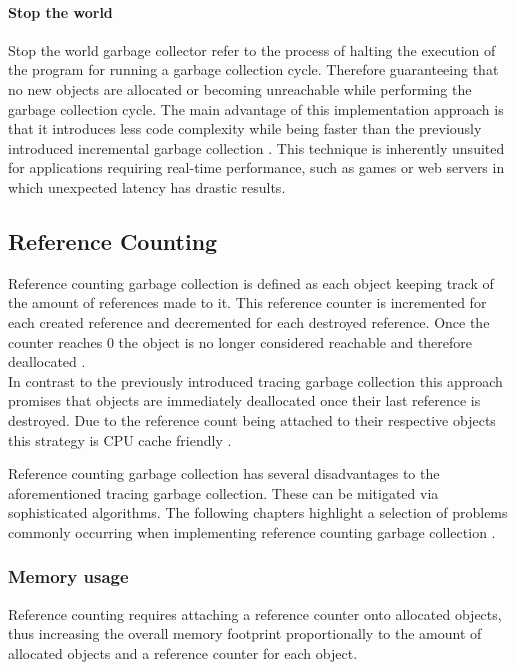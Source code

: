 \paragraph{Stop the world}

Stop the world garbage collector refer to the process of halting the execution
of the program for running a garbage collection cycle. Therefore guaranteeing
that no new objects are allocated or becoming unreachable while performing the
garbage collection cycle. The main advantage of this implementation approach
is that it introduces less code complexity while being faster than the
previously introduced incremental garbage collection \cite[5. The Garbage
Collection Algorithms]{gc-multiprocess_1975}. This technique is inherently
unsuited for applications requiring real-time performance, such as games or
web servers in which unexpected latency has drastic results.

\subsection{Reference Counting}

Reference counting garbage collection is defined as each object keeping track
of the amount of references made to it. This reference counter is incremented
for each created reference and decremented for each destroyed reference. Once
the counter reaches 0 the object is no longer considered reachable and
therefore deallocated \cite[2.2 Precise Reference Counting]{gc-references_2021}
\cite[6. Reference Counting Automatic Storage Reclamation
Algorithms]{gc-generational-scavenging_1984}. \\

In contrast to the previously introduced tracing garbage collection this
approach promises that objects are immediately deallocated once their last
reference is destroyed. Due to the reference count being attached to their
respective objects this strategy is CPU cache friendly \cite[1.
Introduction]{gc-references_2021}.

Reference counting garbage collection has several disadvantages to the
aforementioned tracing garbage collection. These can be mitigated via
sophisticated algorithms. The following chapters highlight a selection of
problems commonly occurring when implementing reference counting garbage
collection \cite[2. Overview]{gc-references_2021}.

\subsubsection{Memory usage}
Reference counting requires attaching a reference counter onto allocated
objects, thus increasing the overall memory footprint proportionally to the
amount of allocated objects and a reference counter for each object.

